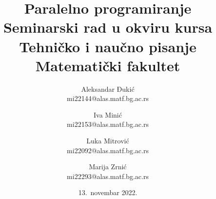 \documentclass[a4paper]{article}
\begin{document}
	
	\title{Paralelno programiranje\\ \small{Seminarski rad u okviru kursa\\Tehničko i naučno pisanje\\ Matematički fakultet}}
	
	\author
	{
		Aleksandar Đukić\\mi22144@alas.matf.bg.ac.rs
		\and
		Iva Minić\\mi22153@alas.matf.bg.ac.rs
		\and
		Luka Mitrović\\mi22092@alas.matf.bg.ac.rs
		\and
		Marija Zrnić\\mi22293@alas.matf.bg.ac.rs
	}
	
	\date{13.~novembar 2022.}
	\maketitle
	
\end{document}
